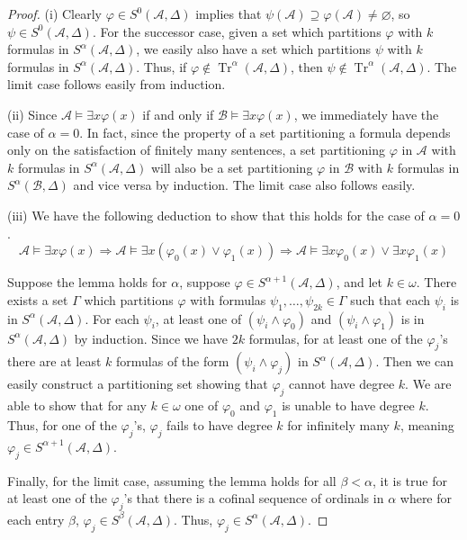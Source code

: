 \documentclass{article}
\DeclareMathOperator{\Tr}{Tr}
\let\mc\mathcal
\begin{document}
\begin{proof}
    (i) Clearly $\varphi \in S^0(\mc{A}, \Delta)$ implies that $\psi(\mc{A}) \supseteq \varphi(\mc{A}) \neq \varnothing$, so $\psi \in S^0(\mc{A}, \Delta)$. For the successor case, given a set which partitions $\varphi$ with $k$ formulas in $S^{\alpha}(\mc{A}, \Delta)$, we easily also have a set which partitions $\psi$ with $k$ formulas in $S^{\alpha}(\mc{A}, \Delta)$. Thus, if $\varphi \notin \Tr^{\alpha}(\mc{A}, \Delta)$, then $\psi \notin \Tr^{\alpha}(\mc{A}, \Delta)$. The limit case follows easily from induction.

    (ii) Since $\mc{A} \vDash \exists x \varphi(x)$ if and only if $\mc{B} \vDash \exists x \varphi(x)$, we immediately have the case of $\alpha = 0$. In fact, since the property of a set partitioning a formula depends only on the satisfaction of finitely many sentences, a set partitioning $\varphi$ in $\mc{A}$ with $k$ formulas in $S^{\alpha}(\mc{A}, \Delta)$ will also be a set partitioning $\varphi$ in $\mc{B}$ with $k$ formulas in $S^{\alpha}(\mc{B}, \Delta)$ and vice versa by induction. The limit case also follows easily.
    
    (iii) We have the following deduction to show that this holds for the case of $\alpha = 0$.
    \[ \mc{A} \vDash \exists x \varphi (x) \Rightarrow \mc{A} \vDash \exists x (\varphi_0 (x) \lor \varphi_1(x)) \Rightarrow \mc{A} \vDash \exists x \varphi_0(x) \lor \exists x \varphi_1(x) \]
    
    Suppose the lemma holds for $\alpha$, suppose $\varphi \in S^{\alpha+1}(\mc{A}, \Delta)$, and let $k \in \omega$. There exists a set $\Gamma$ which partitions $\varphi$ with formulas $\psi_1, \ldots, \psi_{2k} \in \Gamma$ such that each $\psi_i$ is in $S^{\alpha}(\mc{A}, \Delta)$. For each $\psi_i$, at least one of $(\psi_i \land \varphi_0)$ and $(\psi_i \land \varphi_1)$ is in $S^{\alpha}(\mc{A}, \Delta)$ by induction. Since we have $2k$ formulas, for at least one of the $\varphi_j$'s there are at least $k$ formulas of the form $(\psi_i \land \varphi_j)$ in $S^{\alpha}(\mc{A}, \Delta)$. Then we can easily construct a partitioning set showing that $\varphi_j$ cannot have degree $k$. We are able to show that for any $k \in \omega$ one of $\varphi_0$ and $\varphi_1$ is unable to have degree $k$. Thus, for one of the $\varphi_j$'s, $\varphi_j$ fails to have degree $k$ for infinitely many $k$, meaning $\varphi_j \in S^{\alpha+1}(\mc{A}, \Delta)$. 
    
    Finally, for the limit case, assuming the lemma holds for all $\beta < \alpha$, it is true for at least one of the $\varphi_j$'s that there is a cofinal sequence of ordinals in $\alpha$ where for each entry $\beta$, $\varphi_j \in S^{\beta}(\mc{A}, \Delta)$. Thus, $\varphi_j \in S^{\alpha}(\mc{A}, \Delta)$.
\end{proof}
\end{document}
